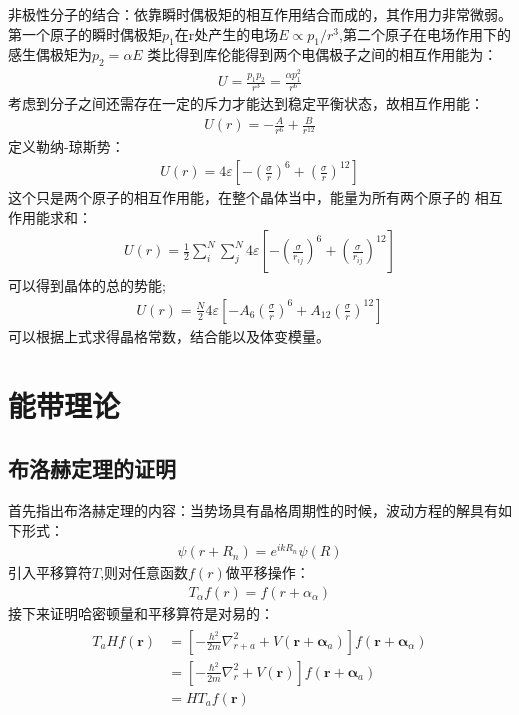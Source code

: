 \documentclass[UTF8]{article}
\numberwithin{equation}{section}
\begin{document}
非极性分子的结合：依靠瞬时偶极矩的相互作用结合而成的，其作用力非常微弱。
第一个原子的瞬时偶极矩$p_1$在r处产生的电场$E\propto p_1/r^3$,第二个原子在电场作用下的感生偶极矩为$p_2=\alpha E$
类比得到库伦能得到两个电偶极子之间的相互作用能为：
\begin{align*}
    U = \frac{p_1p_2}{r^3}=\frac{\alpha p_1^2}{r^6}
\end{align*}
考虑到分子之间还需存在一定的斥力才能达到稳定平衡状态，故相互作用能：
\begin{align*}
    U(r)=-\frac{A}{r^6}+\frac{B}{r^{12}}
\end{align*}
定义勒纳-琼斯势：
\begin{align*}
    U(r)=4\varepsilon[-(\frac{\sigma}{r})^6+(\frac{\sigma}{r})^{12}]
\end{align*}
这个只是两个原子的相互作用能，在整个晶体当中，能量为所有两个原子的
相互作用能求和：
\begin{align*}
    U(r) = \frac{1}{2}\sum_i^{N}\sum_j^{N}4\varepsilon[-(\frac{\sigma}{r_{ij}})^6+(\frac{\sigma}{r_{ij}})^{12}]
\end{align*}
可以得到晶体的总的势能;
\begin{align*}
    U(r) = \frac{N}{2}4\varepsilon[-A_6(\frac{\sigma}{r})^6+A_{12}(\frac{\sigma}{r})^{12}]
\end{align*}
可以根据上式求得晶格常数，结合能以及体变模量。

\newpage
\section{能带理论}
\subsection{布洛赫定理的证明}
首先指出布洛赫定理的内容：当势场具有晶格周期性的时候，波动方程的解具有如下形式：
\begin{align*}
    \psi(r+R_n)=e^{ikR_n}\psi(R)
\end{align*}
引入平移算符$T$,则对任意函数$f(r)$做平移操作：
\begin{align*}
    T_\alpha f(r)=f(r+\alpha_\alpha)
\end{align*}
接下来证明哈密顿量和平移算符是对易的：
\begin{align*}
    \begin{aligned}
        T_{a} H f(\boldsymbol{r}) & =\left[-\frac{h^{2}}{2 m}
            \nabla_{r+a}^{2}+V\left(\boldsymbol{r}+\boldsymbol{\alpha}_{a}\right)\right]
        f\left(\boldsymbol{r}+\boldsymbol{\alpha}_{\alpha}\right)                                  \\
                                  & =\left[-\frac{\hbar^{2}}{2 m} \nabla_{r}^{2}+V(\boldsymbol{r})
            \right] f\left(\boldsymbol{r}+\boldsymbol{\alpha}_{a}\right)
        \\& =H T_{a} f(\boldsymbol{r})
    \end{aligned}
\end{align*}
\end{document}

